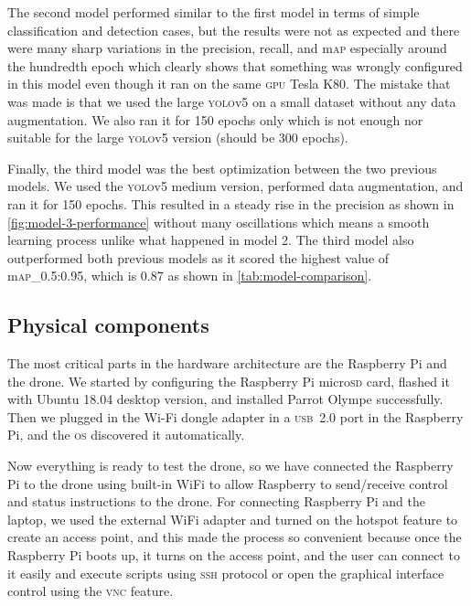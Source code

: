 \documentclass[../main.tex]{subfiles}
\begin{document}
The second model performed similar to the first model in terms of simple 
classification and detection cases, but the results were not as expected and there 
were many sharp variations in the precision, recall, and m\textsc{ap} especially around the 
hundredth epoch which clearly shows that something was wrongly configured in this model
even though it ran on the same \textsc{gpu} Tesla K80.
The mistake that was made is that we used the large \textsc{yolo}v5 on a small dataset
without any data augmentation. We also ran it for 150 epochs only which is not enough nor 
suitable for the large \textsc{yolo}v5 version (should be 300 epochs).

Finally, the third model was the best optimization between the two previous models. 
We used the \textsc{yolo}v5 medium version, performed data augmentation, and ran it for
150 epochs. This resulted in a steady rise in the precision as shown in 
\cref{fig:model-3-performance} without many oscillations which means a smooth learning
process unlike what happened in model 2. 
The third model also outperformed both previous models as it scored the highest value 
of m\textsc{ap}\_0.5:0.95, which is 0.87 as shown in \cref{tab:model-comparison}. 

\subsection{Physical components}

The most critical parts in the hardware
architecture are the Raspberry Pi and the drone. 
We started by configuring the Raspberry Pi micro\textsc{sd} card,
flashed it with Ubuntu 18.04 desktop version,
and installed Parrot Olympe successfully. 
Then we plugged in the Wi-Fi dongle adapter
in a \textsc{usb}~2.0 port in the Raspberry Pi, 
and the \textsc{os} discovered it automatically. 

Now everything is ready to test the 
\anafi drone, so we have connected the
Raspberry Pi to the drone using built-in WiFi
to allow Raspberry to send/receive control and status 
instructions to the drone. 
For connecting Raspberry Pi and the laptop, 
we used the external WiFi adapter and turned 
on the hotspot feature to create an access point,
and this made the process so convenient because 
once the Raspberry Pi boots up, it turns on the 
access point, and the user can connect to it 
easily and execute scripts using \textsc{ssh} 
protocol or open the graphical interface 
control using the \textsc{vnc} feature.
\end{document}
